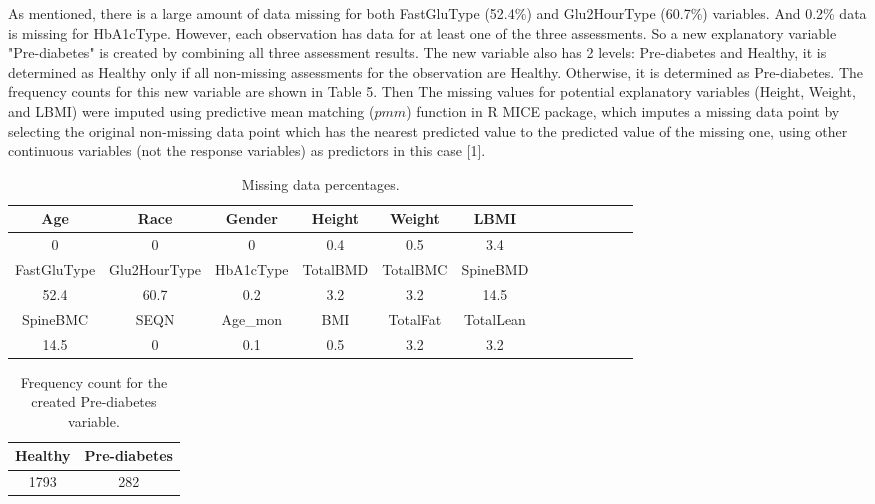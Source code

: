 \documentclass[11pt]{article}
\begin{document}
\medskip

As mentioned, there is a large amount of data missing for both FastGluType (52.4\%) and Glu2HourType (60.7\%) variables. And 0.2\% data is missing for HbA1cType. However, each observation has data for at least one of the three assessments. So a new explanatory variable "Pre-diabetes" is created by combining all three assessment results. The new variable also has 2 levels: Pre-diabetes and Healthy, it is determined as Healthy only if all non-missing assessments for the observation are Healthy. Otherwise, it is determined as Pre-diabetes. The frequency counts for this new variable are shown in Table 5. Then The missing values for potential explanatory variables (Height, Weight, and LBMI) were imputed using predictive mean matching ($pmm$) function in R MICE package, which imputes a missing data point by selecting the original non-missing data point which has the nearest predicted value to the predicted value of the missing one, using other continuous variables (not the response variables) as predictors in this case [1].  
            \begin{table}[ht]
			\centering
				\caption{ Missing data percentages.\label{data3}}
				\begin{tabular}{|c|c|c|c|c|c|c|c|c|c|c|c|c|}
					\hline
Age & Race & Gender& Height& Weight& LBMI  \\
                	\hline
0 & 0& 0 & 0.4 & 0.5 &  3.4  \\\hline
FastGluType &Glu2HourType & HbA1cType& TotalBMD& TotalBMC &SpineBMD  \\\hline
 52.4& 60.7&  0.2& 3.2 & 3.2 & 14.5    \\\hline
   SpineBMC  & SEQN & Age\_mon & BMI& TotalFat&TotalLean \\
                   \hline
  14.5  &  0 & 0.1 &   0.5 & 3.2&3.2  \\\hline
				\end{tabular}
			\end{table}


          \begin{table}[ht]
			\centering
				\caption{ Frequency count for the created Pre-diabetes variable.\label{data3}}
	\begin{tabular}{|c|c|}
					\hline
Healthy & Pre-diabetes  \\\hline
1793 & 282\\\hline
				\end{tabular}
			\end{table}
			
\end{document}
